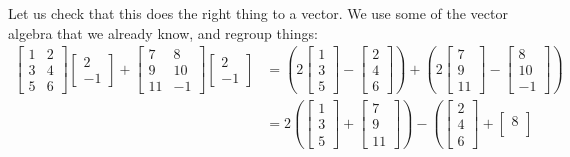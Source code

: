 Let us check that this does the right thing to a vector.  We use some
of the vector algebra that we already know, and
regroup things:
\begin{equation*}
\begin{split}
\begin{bmatrix}
1 & 2 \\
3 & 4 \\
5 & 6
\end{bmatrix}
\begin{bmatrix}
2 \\ -1
\end{bmatrix}
+
\begin{bmatrix}
7 & 8 \\
9 & 10 \\
11 & -1
\end{bmatrix}
\begin{bmatrix}
2 \\ -1
\end{bmatrix}
& =
\left(
2
\begin{bmatrix}
1 \\
3 \\
5
\end{bmatrix}
-
\begin{bmatrix}
2 \\
4 \\
6
\end{bmatrix}
\right)
+
\left(
2
\begin{bmatrix}
7 \\
9 \\
11
\end{bmatrix}
-
\begin{bmatrix}
8 \\
10 \\
-1
\end{bmatrix}
\right)
\\
& =
2
\left(
\begin{bmatrix}
1 \\
3 \\
5
\end{bmatrix}
+
\begin{bmatrix}
7 \\
9 \\
11
\end{bmatrix}
\right)
-
\left(
\begin{bmatrix}
2 \\
4 \\
6
\end{bmatrix}
+
\begin{bmatrix}
8 \\

\end{bmatrix}
\end{split}
\end{equation*}

